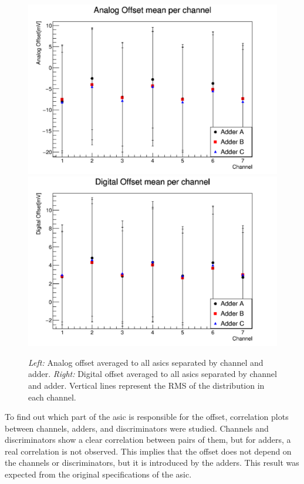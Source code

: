 \documentclass[main.tex]{subfiles}
\begin{document}
\begin{figure}[h]
  \centering
  \includegraphics[width=\textwidth]{./Pictures/analogch.pdf}
  \endminipage
  \includegraphics[width=\textwidth]{./Pictures/digitalch.pdf}
  \endminipage
  \caption{\textit{Left:} Analog offset averaged to all \glspl{asic} separated by channel and adder. \textit{Right:} Digital offset averaged to all \glspl{asic} separated by channel and adder. Vertical lines represent the RMS of the distribution in each channel.}
  \label{fig:offch}
\end{figure}

To find out which part of the \gls{asic} is responsible for the offset, correlation plots between channels, adders, and discriminators were studied. Channels and discriminators show a clear correlation between pairs of them, but for adders, a real correlation is not observed. This implies that the offset does not depend on the channels or discriminators, but it is introduced by the adders. This result was expected from the original specifications of the \gls{asic}.
\end{document}

